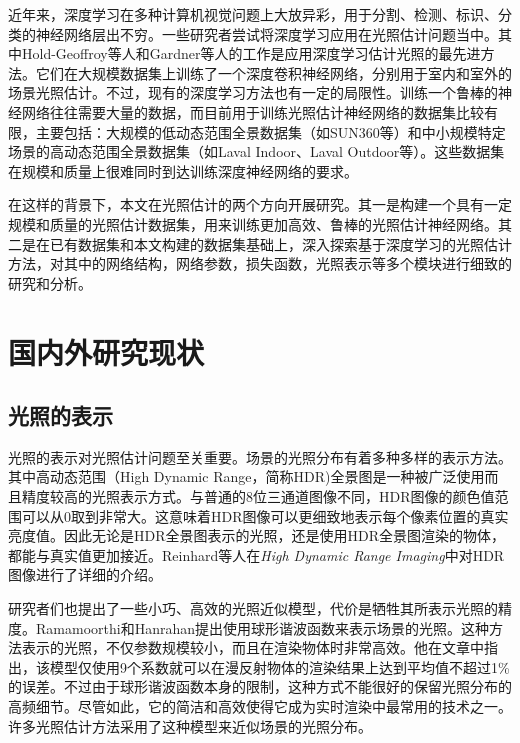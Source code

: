 近年来，深度学习在多种计算机视觉问题上大放异彩，用于分割、检测、标识、分类的神经网络层出不穷。一些研究者尝试将深度学习应用在光照估计问题当中。其中Hold-Geoffroy等人\cite{hold2017deep}和Gardner等人\cite{gardner2017learning}的工作是应用深度学习估计光照的最先进方法。它们在大规模数据集上训练了一个深度卷积神经网络，分别用于室内和室外的场景光照估计。不过，现有的深度学习方法也有一定的局限性。训练一个鲁棒的神经网络往往需要大量的数据，而目前用于训练光照估计神经网络的数据集比较有限，主要包括：大规模的低动态范围全景数据集（如SUN360\cite{xiao2012recognizing}等）和中小规模特定场景的高动态范围全景数据集（如Laval Indoor\cite{gardner2017learning}、Laval Outdoor\cite{hold2019deep}等）。这些数据集在规模和质量上很难同时到达训练深度神经网络的要求。

在这样的背景下，本文在光照估计的两个方向开展研究。其一是构建一个具有一定规模和质量的光照估计数据集，用来训练更加高效、鲁棒的光照估计神经网络。其二是在已有数据集和本文构建的数据集基础上，深入探索基于深度学习的光照估计方法，对其中的网络结构，网络参数，损失函数，光照表示等多个模块进行细致的研究和分析。

\section{国内外研究现状}
\subsection{光照的表示}
光照的表示对光照估计问题至关重要。场景的光照分布有着多种多样的表示方法。其中高动态范围（High Dynamic Range，简称HDR)全景图是一种被广泛使用而且精度较高的光照表示方式。与普通的8位三通道图像不同，HDR图像的颜色值范围可以从0取到非常大。这意味着HDR图像可以更细致地表示每个像素位置的真实亮度值。因此无论是HDR全景图表示的光照，还是使用HDR全景图渲染的物体，都能与真实值更加接近。Reinhard等人在\textit{High Dynamic Range Imaging}\cite{reinhard2005high}中对HDR图像进行了详细的介绍。

研究者们也提出了一些小巧、高效的光照近似模型，代价是牺牲其所表示光照的精度。Ramamoorthi和Hanrahan\cite{ramamoorthi2001efficient}提出使用球形谐波函数来表示场景的光照。这种方法表示的光照，不仅参数规模较小，而且在渲染物体时非常高效。他在文章中指出，该模型仅使用9个系数就可以在漫反射物体的渲染结果上达到平均值不超过1\%的误差。不过由于球形谐波函数本身的限制，这种方式不能很好的保留光照分布的高频细节。尽管如此，它的简洁和高效使得它成为实时渲染中最常用的技术之一\cite{green2003spherical,sloan2008stupid}。许多光照估计方法采用了这种模型来近似场景的光照分布。

